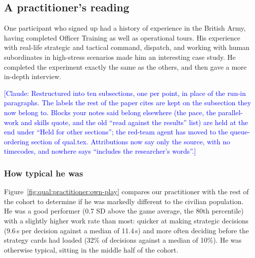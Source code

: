 

\subsection{A practitioner's reading}\label{sec:qual:practitioner}


One participant who signed up had a history of experience in the British Army, having completed Officer Training as well as operational tours. His experience with real-life strategic and tactical command, dispatch, and working with human subordinates in high-stress scenarios made him an interesting case study. He completed the experiment exactly the same as the others, and then gave a more in-depth interview. 

\textcolor{blue}{[Claude: Restructured into ten subsections, one per point, in place of the run-in paragraphs. The labels the rest of the paper cites are kept on the subsection they now belong to. Blocks your notes said belong elsewhere (the pace, the parallel-work and skills quote, and the old ``read against the results'' list) are held at the end under ``Held for other sections''; the red-team agent has moved to the queue-ordering section of qual.tex. Attributions now say only the source, with no timecodes, and nowhere says ``includes the researcher's words''.]}

\subsubsection{How typical he was}\label{sec:qual:practitioner:own-play}

Figure~\ref{fig:qual:practitioner:own-play} compares our practitioner with the rest of the cohort to determine if he was markedly different to the civilian population. He was a good performer (0.7 SD above the game average, the 80th percentile) with a slightly higher work rate than most: quicker at making strategic decisions (9.6\,s per decision against a median of 11.4\,s) and more often deciding before the strategy cards had loaded (32\% of decisions against a median of 10\%). He was otherwise typical, sitting in the middle half of the cohort.

